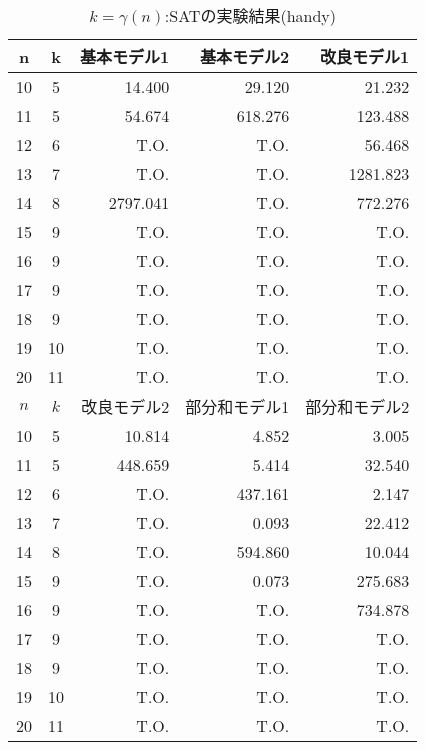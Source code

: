 \begin{table}[ht]
 \caption{$k=\gamma(n)$:SATの実験結果(handy)}
 \label{tb:exSAT}
 \centering
 \begin{tabular}{|c|c|r|r|r|} \hline
  n & k & 基本モデル1 & 基本モデル2 & 改良モデル1 \\ \hline
  10 & 5 & 14.400 & 29.120 & 21.232 \\
  11 & 5 & 54.674 & 618.276 & 123.488 \\
  12 & 6 & T.O. & T.O. & 56.468 \\
  13 & 7 & T.O. & T.O. & 1281.823 \\
  14 & 8 & 2797.041 & T.O. & 772.276 \\
  15 & 9 & T.O. & T.O. & T.O. \\
  16 & 9 & T.O. & T.O. & T.O. \\
  17 & 9 & T.O. & T.O. & T.O. \\
  18 & 9 & T.O. & T.O. & T.O. \\
  19 & 10 & T.O. & T.O. & T.O. \\
  20 & 11 & T.O. & T.O. & T.O. \\ \hline \hline
  $n$ & $k$ & 改良モデル2 & 部分和モデル1 & 部分和モデル2 \\ \hline
  10 & 5 & 10.814 & 4.852 & 3.005 \\
  11 & 5 & 448.659 & 5.414 & 32.540 \\
  12 & 6 & T.O. & 437.161 & 2.147 \\
  13 & 7 & T.O. & 0.093 & 22.412 \\
  14 & 8 & T.O. & 594.860 & 10.044\\
  15 & 9 & T.O. & 0.073 & 275.683 \\
  16 & 9 & T.O. & T.O. & 734.878 \\
  17 & 9 & T.O. & T.O. & T.O. \\
  18 & 9 & T.O. & T.O. & T.O. \\
  19 & 10 & T.O. & T.O. & T.O. \\
  20 & 11 & T.O. & T.O. & T.O. \\ \hline
 \end{tabular}
\end{table}

